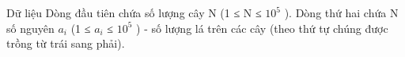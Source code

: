 Dữ liệu
Dòng đầu tiên chứa số lượng cây N (1 ≤ N ≤ $10^{5}$   ). Dòng thứ hai chứa N số nguyên $a_{i}$   (1 ≤ $a_{i}$   ≤ $10^{5}$   ) - số lượng lá trên các cây (theo thứ tự chúng được trồng từ trái sang phải).